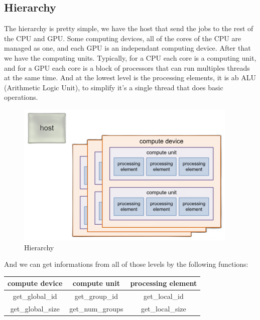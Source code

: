 \documentclass[12pt, openany]{report}
\theoremstyle{definition}
\begin{document}
\subsection{Hierarchy}
The hierarchy is pretty simple, we have the host that send the jobs to the rest of the CPU and GPU. Some computing devices, all of the cores of the CPU are managed as one, and each GPU is an independant computing device. After that we have the computing units. Typically, for a CPU each core is a computing unit, and for a GPU each core is a block of processors that can run multiples threads at the same time. And at the lowest level is the processing elements, it is ab ALU (Arithmetic Logic Unit), to simplify it's a single thread that does basic operations.\\
\begin{figure}[H]
	\centering
	\includegraphics[width=0.8\linewidth]{img/hierarchy.png}
	\caption{Hierarchy}
	\label{fig:Hierarchy}
\end{figure}
And we can get informations from all of those levels by the following functions:
\begin{center}
	\begin{tabular}{|c|c|c|}
		\hline
		compute device & compute unit & processing element \\
		\hline
		get\_global\_id & get\_group\_id & get\_local\_id \\
		\hline
		get\_global\_size & get\_num\_groups & get\_local\_size \\
		\hline
	\end{tabular}
\end{center}
\end{document}

